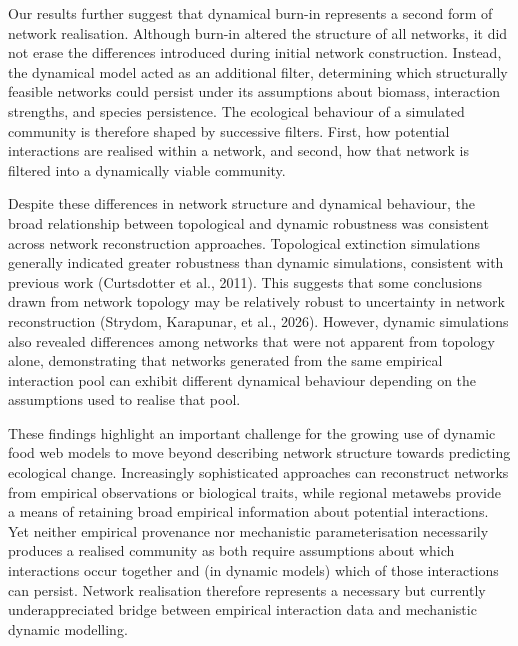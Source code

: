 \documentclass[
]{article}
\begin{document}
Our results further suggest that dynamical burn-in represents a second
form of network realisation. Although burn-in altered the structure of
all networks, it did not erase the differences introduced during initial
network construction. Instead, the dynamical model acted as an
additional filter, determining which structurally feasible networks
could persist under its assumptions about biomass, interaction
strengths, and species persistence. The ecological behaviour of a
simulated community is therefore shaped by successive filters. First,
how potential interactions are realised within a network, and second,
how that network is filtered into a dynamically viable community.

Despite these differences in network structure and dynamical behaviour,
the broad relationship between topological and dynamic robustness was
consistent across network reconstruction approaches. Topological
extinction simulations generally indicated greater robustness than
dynamic simulations, consistent with previous work (Curtsdotter et al.,
2011). This suggests that some conclusions drawn from network topology
may be relatively robust to uncertainty in network reconstruction
(Strydom, Karapunar, et al., 2026). However, dynamic simulations also
revealed differences among networks that were not apparent from topology
alone, demonstrating that networks generated from the same empirical
interaction pool can exhibit different dynamical behaviour depending on
the assumptions used to realise that pool.

These findings highlight an important challenge for the growing use of
dynamic food web models to move beyond describing network structure
towards predicting ecological change. Increasingly sophisticated
approaches can reconstruct networks from empirical observations or
biological traits, while regional metawebs provide a means of retaining
broad empirical information about potential interactions. Yet neither
empirical provenance nor mechanistic parameterisation necessarily
produces a realised community as both require assumptions about which
interactions occur together and (in dynamic models) which of those
interactions can persist. Network realisation therefore represents a
necessary but currently underappreciated bridge between empirical
interaction data and mechanistic dynamic modelling.
\end{document}
